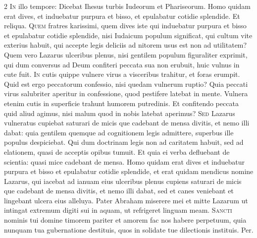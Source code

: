 \begin{multicols*}{2}
\lettrine[lines=2]{\zallmancaps \color{Blue} I}{n} illo tempore: Dicebat Ihesus turbis Iudeorum et Phariseorum. Homo quidam erat dives, et induebatur purpura et bisso, et epulabatur cotidie splendide. Et reliqua.
 \grecross
\lettrine[lines=2]{\zallmancaps \color{Red} Q}{uem} fratres karissimi, quem dives iste qui induebatur purpura et bisso et epulabatur cotidie splendide, nisi Iudaicum populum significat, qui cultum vite exterius habuit, qui accepte legis deliciis ad nitorem usus est non ad utilitatem? Quem vero Lazarus ulceribus plenus, nisi gentilem populum figuraliter exprimit, qui dum conversus ad Deum confiteri peccata sua non erubuit, huic vulnus in cute fuit.
\lettrine[lines=2]{\zallmancaps \color{Blue} I}{n} cutis quippe vulnere virus a visceribus trahitur, et foras erumpit. Quid est ergo peccatorum confessio, nisi quedam vulnerum ruptio? Quia peccati virus salubriter aperitur in confessione, quod pestifere latebat in mente. Vulnera etenim cutis in superficie trahunt humorem putredinis. Et confitendo peccata quid aliud agimus, nisi malum quod in nobis latebat aperimus?
\lettrine[lines=2]{\zallmancaps \color{Red} S}{ed} Lazarus vulneratus cupiebat saturari de micis que cadebant de mensa divitis, et nemo illi dabat: quia gentilem quemque ad cognitionem legis admittere, superbus ille populus despiciebat. Qui dum doctrinam legis non ad caritatem habuit, sed ad elationem, quasi de acceptis opibus tumuit. Et quia ei verba defluebant de scientia: quasi mice cadebant de mensa.
 Homo quidam erat dives et induebatur purpura et bisso et epulabatur cotidie splendide, et erat quidam mendicus nomine Lazarus, qui iacebat ad ianuam eius ulceribus plenus cupiens saturari de micis que cadebant de mensa divitis, et nemo illi dabat, sed et canes veniebant et lingebant ulcera eius alleluya.
 Pater Abraham miserere mei et mitte Lazarum ut intingat extremum digiti sui in aquam, ut refrigeret linguam meam.
\lettrine[lines=2]{\zallmancaps \color{Blue} S}{ancti} nominis tui domine timorem pariter et amorem fac nos habere perpetuum, quia nunquam tua gubernatione destituis, quos in solidate tue dilectionis instituis. Per.

\end{multicols*}
